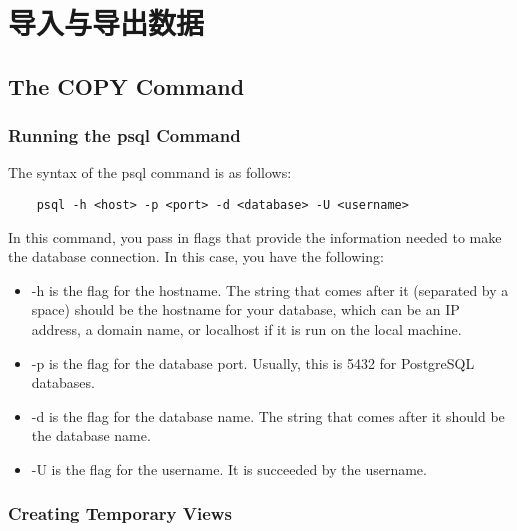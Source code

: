 \chapter{导入与导出数据\label{ch06}}
\section{The COPY Command}
\subsection{Running the psql Command}
The syntax of the psql command is as follows:
\begin{verbatim}
    psql -h <host> -p <port> -d <database> -U <username>
\end{verbatim}
In this command, you pass in flags that provide the information needed to make the database connection. In this case, you have the following:
\begin{itemize}
    \item  -h is the flag for the hostname. The string that comes after it (separated by a space) should be the hostname for your database, which can be an IP address, a domain name, or localhost if it is run on the local machine.
    \item  -p is the flag for the database port. Usually, this is 5432 for PostgreSQL databases.
    \item  -d is the flag for the database name. The string that comes after it should be the database name.
    \item  -U is the flag for the username. It is succeeded by the username.
\end{itemize}

\subsection{Creating Temporary Views}
